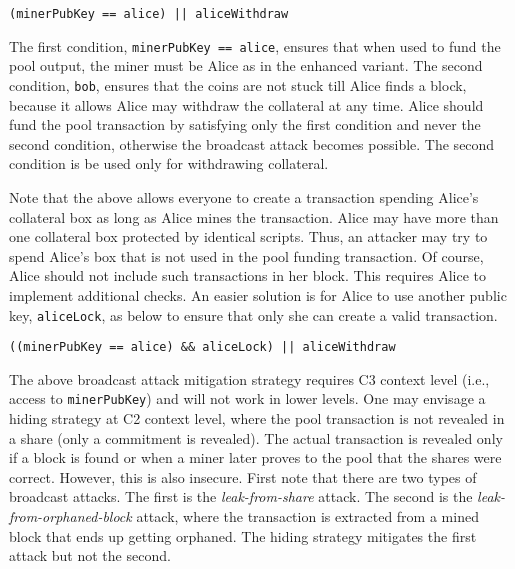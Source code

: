\documentclass{llncs}
\begin{document}
\begin{verbatim}
(minerPubKey == alice) || aliceWithdraw
\end{verbatim}

The first condition, \texttt{minerPubKey == alice}, ensures that when used to fund the pool output, the miner must be Alice as in the enhanced variant. The second condition, \texttt{bob}, ensures that the coins are not stuck till Alice finds a block, because it allows Alice may withdraw the collateral at any time.
Alice should fund the pool transaction by satisfying only the first condition and never the second condition, otherwise the broadcast attack becomes possible. The second condition is be used only for withdrawing collateral.

Note that the above allows everyone to create a transaction spending Alice's collateral box as long as Alice mines the transaction. Alice may have more than one collateral box protected by identical scripts. Thus, an attacker may try to spend Alice's box that is not used in the pool funding transaction. Of course, Alice should not include such transactions in her block. This requires Alice to implement additional checks. An easier solution is for Alice to use another public key, \texttt{aliceLock}, as below to ensure that only she can create a valid transaction. 

\begin{verbatim}
((minerPubKey == alice) && aliceLock) || aliceWithdraw
\end{verbatim}

The above broadcast attack mitigation strategy requires C3 context level (i.e., access to \texttt{minerPubKey}) and will not work in lower levels. One may envisage a hiding strategy at C2 context level, where the pool transaction is not revealed in a share (only a commitment is revealed). The actual transaction is revealed only if a block is found or when a miner later proves to the pool that the shares were correct. However, this is also insecure. First note that there are two types of broadcast attacks. The first is the {\em leak-from-share} attack. The second is the {\em leak-from-orphaned-block} attack, where the transaction is extracted from a mined block that ends up getting orphaned. The hiding strategy mitigates the first attack but not the second. 
\end{document}
